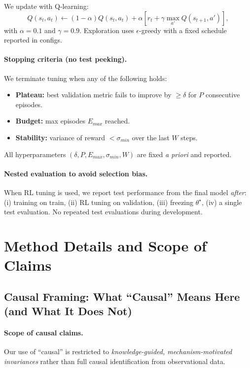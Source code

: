 \documentclass{article}
\begin{document}
We update with Q-learning:
\begin{equation}
Q(s_t,a_t) \leftarrow (1-\alpha)Q(s_t,a_t) + \alpha \left[r_t + \gamma \max_{a'} Q(s_{t+1},a')\right],
\end{equation}
with $\alpha=0.1$ and $\gamma=0.9$. Exploration uses $\epsilon$-greedy with a fixed schedule reported in configs.

\paragraph{Stopping criteria (no test peeking).}
We terminate tuning when any of the following holds:
\begin{itemize}
  \item \textbf{Plateau:} best validation metric fails to improve by $\ge \delta$ for $P$ consecutive episodes.
  \item \textbf{Budget:} max episodes $E_{max}$ reached.
  \item \textbf{Stability:} variance of reward $<\sigma_{min}$ over the last $W$ steps.
\end{itemize}
All hyperparameters $(\delta,P,E_{max},\sigma_{min},W)$ are fixed \emph{a priori} and reported.

\paragraph{Nested evaluation to avoid selection bias.}
When RL tuning is used, we report test performance from the final model \emph{after}:
(i) training on train,
(ii) RL tuning on validation,
(iii) freezing $\theta^\star$,
(iv) a single test evaluation.
No repeated test evaluations during development.



%  
\section{Method Details and Scope of Claims}
\label{app:method-details}

\subsection{Causal Framing: What ``Causal'' Means Here (and What It Does Not)}
\label{app:causal_framing}

\paragraph{Scope of causal claims.}
Our use of ``causal'' is restricted to \emph{knowledge-guided,
mechanism-motivated invariances} rather than full causal identification
from observational data.
\end{document}
